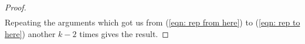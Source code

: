 \begin{proof}
\begin{align}
	\end{align}
	Repeating the arguments which got us from (\ref{eqn: rep from here}) to (\ref{eqn: rep to here}) another \(k-2\) times gives the result.
\end{proof}

